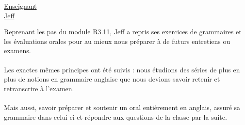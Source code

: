 \renewcommand{\figurename}{}

\vspace*{0.2cm}%
      \large
      \href{}{\color{black}Enseignant\\Jeff}\\%
      \normalsize
\vspace*{0.5cm}%

Reprenant les pas du module R3.11, Jeff a repris ses exercices de grammaires et les évaluations orales pour au mieux nous préparer à de futurs entretiens ou examens.
\\ \\
Les exactes mêmes principes ont été suivis : nous étudions des séries de plus en plus de notions en grammaire anglaise que nous devions savoir retenir et retranscrire à l'examen.
\\ \\
Mais aussi, savoir préparer et soutenir un oral entièrement en anglais, assuré sa grammaire dans celui-ci et répondre aux questions de la classe par la suite.